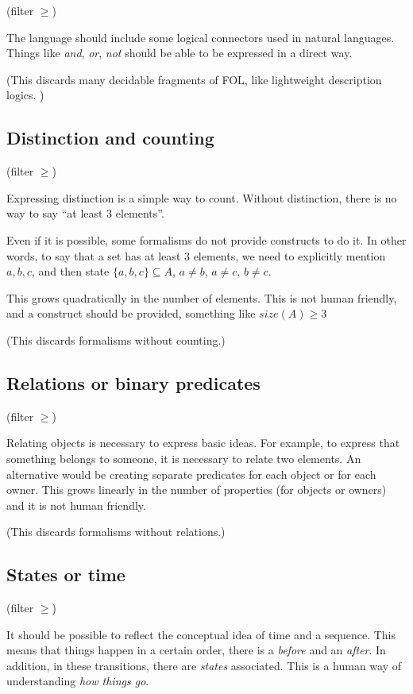(filter $\geq $)

The language should include some logical connectors used in natural languages.
Things like \textit{and}, \textit{or}, \textit{not} should be able to be expressed in a direct way.

(This discards many decidable fragments of FOL, like lightweight description logics. )

\subsection{Distinction and counting}

(filter $\geq $)

Expressing distinction is a simple way to count.
Without distinction, there is no way to say ``at least 3 elements''.

Even if it is possible, some formalisms do not provide constructs to do it.
In other words, to say that a set has at least 3 elements, we need to explicitly mention $a, b, c$, and then state
$\{a, b, c\} \subseteq A$, $a \neq b$, $a \neq c$, $b \neq c$.

This grows quadratically in the number of elements.
This is not human friendly, and a construct should be provided, something like $size(A) \geq 3$

(This discards formalisms without counting.)

\subsection{Relations or binary predicates}

(filter $\geq $)

Relating objects is necessary to express basic ideas.
For example, to express that something belongs to someone, it is necessary to relate two elements.
An alternative would be creating separate predicates for each object or for each owner.
This grows linearly in the number of properties (for objects or owners) and it is not human friendly.

(This discards formalisms without relations.)

\subsection{States or time}

(filter $\geq $)

It should be possible to reflect the conceptual idea of time and a sequence.
This means that things happen in a certain order, there is a \textit{before} and an \textit{after}.
In addition, in these transitions, there are \textit{states} associated.
This is a human way of understanding \textit{how things go}.

